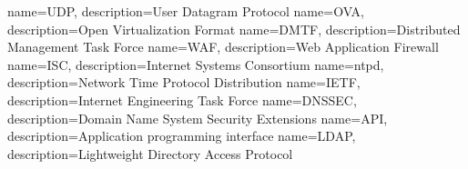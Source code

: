 {
  name=UDP,
  description={User Datagram Protocol}
}
{
  name=OVA,
  description={Open Virtualization Format}
}
{
  name=DMTF,
  description={Distributed Management Task Force}
}
{
  name=WAF,
  description={Web Application Firewall}
}
{
  name=ISC,
  description={Internet Systems Consortium}
}
{
  name=ntpd,
  description={Network Time Protocol Distribution}
}
{
  name=IETF,
  description={Internet Engineering Task Force}
}
{
  name=DNSSEC,
  description={Domain Name System Security Extensions}
}
{
  name=API,
  description={Application programming interface}
}
{
  name=LDAP,
  description={Lightweight Directory Access Protocol}
}



